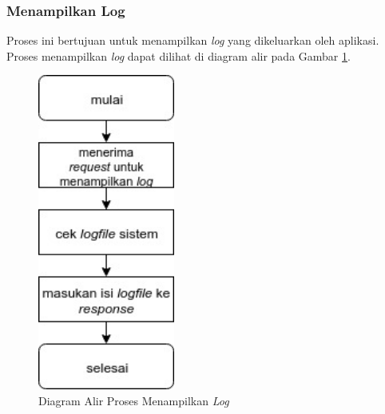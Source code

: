 \subsubsection{Menampilkan Log}
\par Proses ini bertujuan untuk menampilkan \textit{log} yang dikeluarkan oleh aplikasi. Proses menampilkan \textit{log} dapat dilihat di diagram alir pada Gambar \ref{fc:log}.
\begin{figure}[H]
	\centering\includegraphics[width=0.4\textwidth]{bab3/img/flowchart-menampilkan_log.jpg}
	\caption{Diagram Alir Proses Menampilkan \textit{Log}} \label{fc:log}
\end{figure}

\clearpage

